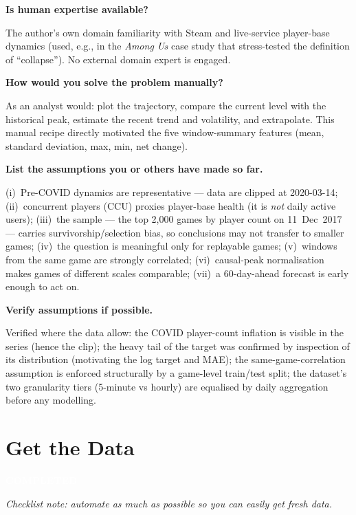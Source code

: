 \documentclass[11pt,a4paper]{article}
\newcommand{\StatusBadge}[2]{\colorbox{#1}{\textcolor{white}{\sffamily\bfseries\footnotesize\;#2\;}}}
\newcommand{\SectionStatus}[2]{\noindent\StatusBadge{#1}{#2}\par\medskip}
\newcommand{\chk}[1]{\item \textbf{#1}\par\nopagebreak\vspace{0.15em}}
\newcommand{\guidance}[1]{\textcolor{soft}{\small\itshape Checklist note: #1}\par\medskip}
\begin{document}
\begin{checklist}
\chk{Is human expertise available?}
The author's own domain familiarity with Steam and live-service player-base
dynamics (used, e.g., in the \emph{Among Us} case study that stress-tested
the definition of ``collapse''). No external domain expert is engaged.

\chk{How would you solve the problem manually?}
As an analyst would: plot the trajectory, compare the current level with the
historical peak, estimate the recent trend and volatility, and extrapolate.
This manual recipe directly motivated the five window-summary features
(mean, standard deviation, max, min, net change).

\chk{List the assumptions you or others have made so far.}
(i)~Pre-COVID dynamics are representative --- data are clipped at
2020-03-14; (ii)~concurrent players (CCU) proxies player-base health (it is
\emph{not} daily active users); (iii)~the sample --- the top 2{,}000 games by
player count on 11~Dec~2017 --- carries survivorship/selection bias, so
conclusions may not transfer to smaller games; (iv)~the question is
meaningful only for replayable games; (v)~windows from the same game are
strongly correlated; (vi)~causal-peak normalisation makes games of different
scales comparable; (vii)~a 60-day-ahead forecast is early enough to act on.

\chk{Verify assumptions if possible.}
Verified where the data allow: the COVID player-count inflation is visible
in the series (hence the clip); the heavy tail of the target was confirmed
by inspection of its distribution (motivating the log target and MAE); the
same-game-correlation assumption is enforced structurally by a game-level
train/test split; the dataset's two granularity tiers (5-minute vs hourly)
are equalised by daily aggregation before any modelling.

\end{checklist}

\section{Get the Data}
\SectionStatus{stdone}{COMPLETED}
\guidance{automate as much as possible so you can easily get fresh data.}
\end{document}
